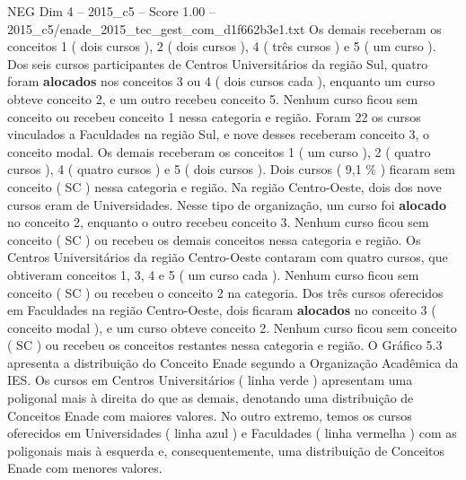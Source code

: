 \begin{textsample}{NEG Dim 4 – 2015\_c5 – Score 1.00 – 2015\_c5/enade\_2015\_tec\_gest\_com\_d1f662b3e1.txt}
Os demais receberam os conceitos 1 ( dois cursos ), 2 ( dois cursos ), 4 ( três cursos ) e 5 ( um curso ).
Dos seis cursos participantes de Centros Universitários da região Sul, quatro foram \textbf{alocados} nos conceitos 3 ou 4 ( dois cursos cada ), enquanto um curso obteve conceito 2, e um outro recebeu conceito 5.
Nenhum curso ficou sem conceito ou recebeu conceito 1 nessa categoria e região.
Foram 22 os cursos vinculados a Faculdades na região Sul, e nove desses receberam conceito 3, o conceito modal.
Os demais receberam os conceitos 1 ( um curso ), 2 ( quatro cursos ), 4 ( quatro cursos ) e 5 ( dois cursos ).
Dois cursos ( 9,1 \% ) ficaram sem conceito ( SC ) nessa categoria e região.
Na região Centro-Oeste, dois dos nove cursos eram de Universidades.
Nesse tipo de organização, um curso foi \textbf{alocado} no conceito 2, enquanto o outro recebeu conceito 3.
Nenhum curso ficou sem conceito ( SC ) ou recebeu os demais conceitos nessa categoria e região.
Os Centros Universitários da região Centro-Oeste contaram com quatro cursos, que obtiveram conceitos 1, 3, 4 e 5 ( um curso cada ).
Nenhum curso ficou sem conceito ( SC ) ou recebeu o conceito 2 na categoria.
Dos três cursos oferecidos em Faculdades na região Centro-Oeste, dois ficaram \textbf{alocados} no conceito 3 ( conceito modal ), e um curso obteve conceito 2.
Nenhum curso ficou sem conceito ( SC ) ou recebeu os conceitos restantes nessa categoria e região.
O Gráfico 5.3 apresenta a distribuição do Conceito Enade segundo a Organização Acadêmica da IES.
Os cursos em Centros Universitários ( linha verde ) apresentam uma poligonal mais à direita do que as demais, denotando uma distribuição de Conceitos Enade com maiores valores.
No outro extremo, temos os cursos oferecidos em Universidades ( linha azul ) e Faculdades ( linha vermelha ) com as poligonais mais à esquerda e, consequentemente, uma distribuição de Conceitos Enade com menores valores.

\end{textsample}
